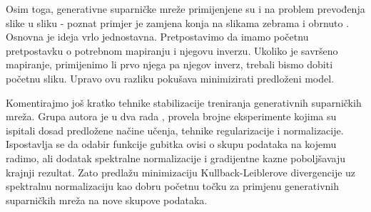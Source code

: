 Osim toga, generativne suparničke mreže primijenjene su i na problem prevođenja slike u sliku - poznat primjer je zamjena konja na slikama zebrama i obrnuto \citep{zhu2017unpaired}. Osnovna je ideja vrlo jednostavna. Pretpostavimo da imamo početnu pretpostavku o potrebnom mapiranju i njegovu inverzu. Ukoliko je savršeno mapiranje, primijenimo li prvo njega pa njegov inverz, trebali bismo dobiti početnu sliku. Upravo ovu razliku pokušava minimizirati predloženi model.

Komentirajmo još kratko tehnike stabilizacije treniranja generativnih suparničkih mreža. Grupa autora je u dva rada \citep{kurach2018largescale}, \citep{lucic2017gans} provela brojne eksperimente kojima su ispitali dosad predložene načine učenja, tehnike regularizacije i normalizacije. Ispostavlja se da odabir funkcije gubitka ovisi o skupu podataka na kojemu radimo, ali dodatak spektralne normalizacije i gradijentne kazne poboljšavaju krajnji rezultat. Zato predlažu minimizaciju Kullback-Leiblerove divergencije uz spektralnu normalizaciju kao dobru početnu točku za primjenu generativnih suparničkih mreža na nove skupove podataka. 